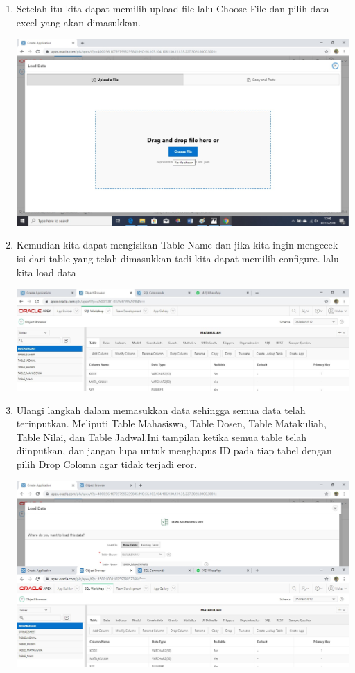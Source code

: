 \documentclass[a4paper,12pt]{report}
\begin{document}
\begin{enumerate}
\begin{center}
    \end{center}
    \item Setelah itu kita dapat memilih upload file lalu Choose  File dan pilih data excel yang akan dimasukkan.
     \begin{center}
    \includegraphics[width=11cm\textwidth]{figure/5.jpg}
    \end{center}
    \item Kemudian kita dapat mengisikan Table Name dan jika kita ingin mengecek isi dari table yang telah dimasukkan tadi kita dapat memilih configure. lalu kita load data
     \begin{center}
    \includegraphics[width=11cm\textwidth]{figure/6.1.jpg}
    \end{center}
    \item Ulangi langkah dalam memasukkan data sehingga semua data telah terinputkan. Meliputi Table Mahasiswa, Table Dosen, Table Matakuliah, Table Nilai, dan Table Jadwal.Ini tampilan ketika semua table telah diinputkan, dan jangan lupa untuk menghapus ID pada tiap tabel dengan pilih Drop Colomn agar tidak terjadi eror.
    \begin{center}
    \includegraphics[width=11cm\textwidth]{figure/8.jpg}

\end{center}
\end{enumerate}
\end{document}

